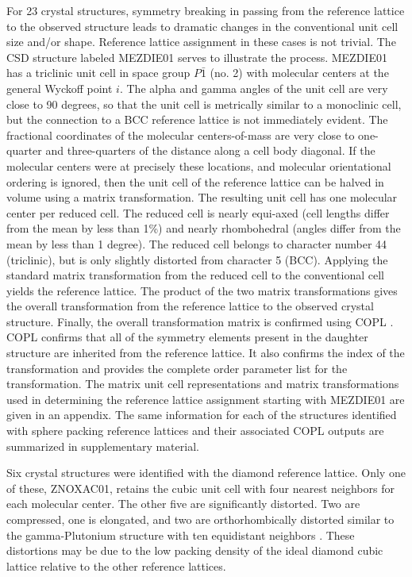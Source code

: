 \documentclass{iucr}              %
\begin{document}
For 23 crystal structures, symmetry breaking in passing from the reference lattice to the observed structure leads to dramatic changes in the conventional unit cell size and/or shape.  Reference lattice assignment in these cases is not trivial.  The CSD structure labeled MEZDIE01 serves to illustrate the process.  MEZDIE01 has a triclinic unit cell in space group $P\bar{1}$ (no. 2) with molecular centers at the general Wyckoff point $i$.  The alpha and gamma angles of the unit cell are very close to 90 degrees, so that the unit cell is metrically similar to a monoclinic cell, but the connection to a BCC reference lattice is not immediately evident.  The fractional coordinates of the molecular centers-of-mass are very close to one-quarter and three-quarters of the distance along a cell body diagonal.  If the molecular centers were at precisely these locations, and molecular orientational ordering is ignored, then the unit cell of the reference lattice can be halved in volume using a matrix transformation.  The resulting unit cell has one molecular center per reduced cell.  The reduced cell is nearly equi-axed (cell lengths differ from the mean by less than 1\%) and nearly rhombohedral (angles differ from the mean by less than 1 degree).  The reduced cell belongs to character number 44 (triclinic), but is only slightly distorted from character 5 (BCC).  Applying the standard matrix transformation from the reduced cell to the conventional cell yields the reference lattice.  The product of the two matrix transformations gives the overall transformation from the reference lattice to the observed crystal structure.  Finally, the overall transformation matrix is confirmed using COPL \cite{Stokes01}.  COPL confirms that all of the symmetry elements present in the daughter structure are inherited from the reference lattice.  It also confirms the index of the transformation and provides the complete order parameter list for the transformation.  The matrix unit cell representations and matrix transformations used in determining the reference lattice assignment starting with MEZDIE01 are given in an appendix.  The same information for each of the structures identified with sphere packing reference lattices and their associated COPL outputs are summarized in supplementary material.

Six crystal structures were identified with the diamond reference lattice.  Only one of these, ZNOXAC01, retains the cubic unit cell with four nearest neighbors for each molecular center.  The other five are significantly distorted.  Two are compressed, one is elongated, and two are orthorhombically distorted similar to the gamma-Plutonium structure with ten equidistant neighbors \cite{NRL08}.  These distortions may be due to the low packing density of the ideal diamond cubic lattice relative to the other reference lattices.
\end{document}
